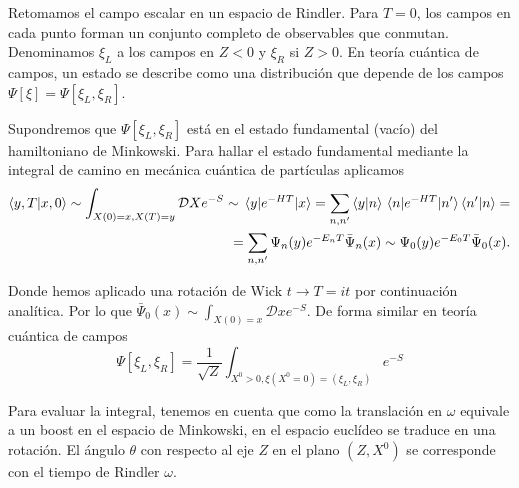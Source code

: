 Retomamos el campo escalar en un espacio de Rindler. 
Para $T=0$, los campos en cada punto forman un conjunto completo de observables que 
conmutan. Denominamos $\xi_L$ a los campos en $Z<0$ y $\xi_R$ si $Z>0$.
En teoría cuántica de campos, un estado se describe como una distribución que 
depende de los campos $\Psi[\xi]=\Psi[\xi_L,\xi_R]$.

Supondremos que $\Psi[\xi_L,\xi_R]$ está en el estado fundamental (vacío) del hamiltoniano
de Minkowski. Para hallar el estado fundamental mediante la integral de camino 
en mecánica cuántica de partículas aplicamos
\begin{align}
  \braket{y,T}{x,0}\sim \int_{X(0)=x,X(T)=y} \mathcal D X e^{-S} \sim 
  \mel{y}{e^{-HT}}{x}=\sum_{n,n'} \ip{y}{n}\mel{n}{e^{-HT}}{n'}\ip{n'}{n}=\\
  =\sum_{n,n'} \Psi_n(y) e^{-E_n T} \bar{\Psi}_n(x)\sim   \Psi_0(y) e^{-E_0 T} \bar{\Psi}_0(x).
\end{align}

Donde hemos aplicado una rotación de Wick $t\to T=it$ por continuación analítica.
Por lo que $\bar{\Psi}_0(x)\sim \int_{X(0)=x} \mathcal D x e^{-S}$.
De forma similar en teoría cuántica de campos 
\begin{equation}
  \Psi[\xi_L,\xi_R]=\frac{1}{\sqrt{Z}}\int_{X^0>0, \xi(X^0=0)=(\xi_L,\xi_R)} e^{-S}
\end{equation}

Para evaluar la integral, tenemos en cuenta que como la translación en $\omega$
equivale a un boost en el espacio de Minkowski, en el espacio euclídeo se traduce
en una rotación.
El ángulo $\theta$ con respecto al eje $Z$ en el plano $(Z,X^0)$ se corresponde con
el tiempo de Rindler $\omega$.
